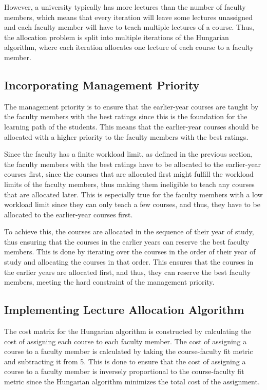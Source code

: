 However, a university typically has more lectures than the number of faculty members, which means that every iteration will leave some lectures unassigned and each faculty member will have to teach multiple lectures of a course. Thus, the allocation problem is split into multiple iterations of the Hungarian algorithm, where each iteration allocates one lecture of each course to a faculty member.

\subsection{Incorporating Management Priority}

The management priority is to ensure that the earlier-year courses are taught by the faculty members with the best ratings since this is the foundation for the learning path of the students. This means that the earlier-year courses should be allocated with a higher priority to the faculty members with the best ratings.

Since the faculty has a finite workload limit, as defined in the previous section, the faculty members with the best ratings have to be allocated to the earlier-year courses first, since the courses that are allocated first might fulfill the workload limits of the faculty members, thus making them ineligible to teach any courses that are allocated later. This is especially true for the faculty members with a low workload limit since they can only teach a few courses, and thus, they have to be allocated to the earlier-year courses first.

To achieve this, the courses are allocated in the sequence of their year of study, thus ensuring that the courses in the earlier years can reserve the best faculty members. This is done by iterating over the courses in the order of their year of study and allocating the courses in that order. This ensures that the courses in the earlier years are allocated first, and thus, they can reserve the best faculty members, meeting the hard constraint of the management priority.

\subsection{Implementing Lecture Allocation Algorithm}

The cost matrix for the Hungarian algorithm is constructed by calculating the cost of assigning each course to each faculty member. The cost of assigning a course to a faculty member is calculated by taking the course-faculty fit metric and subtracting it from 5. This is done to ensure that the cost of assigning a course to a faculty member is inversely proportional to the course-faculty fit metric since the Hungarian algorithm minimizes the total cost of the assignment.

